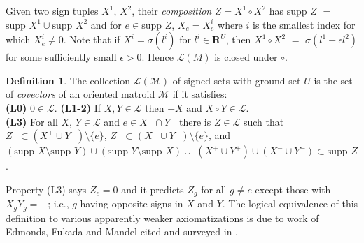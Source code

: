 \documentclass{amsproc-sunycstr}
\def\Reals{\ensuremath{\mathbf R}}
\theoremstyle{plain}
\theoremstyle{definition}
\newtheorem{definition}{Definition}
\theoremstyle{remark}
\newcommand{\supp}[1]{{{\mbox{supp\ }#1}}}
\begin{document}
Given two sign tuples $X^1$, $X^2$, their \textit{composition}
$Z=X^1 \circ X^2$ has $\supp{Z}$ $=$ 
$\supp{X^1}\cup \supp{X^2}$
and 
for $e\in\supp{Z}$,
$X_e=X^i_e$ where $i$ is the smallest index for which $X^i_e\neq 0$.
Note that if $X^i=\sigma(l^i)$ for $l^i\in\Reals^U$, then $X^1\circ X^2$
$=$ $\sigma(l^1 + \epsilon l^2)$ for some sufficiently small $\epsilon >0$.
Hence $\mathcal{L}(M)$ is closed under 
$\circ$.

\label{OMDEFsec}
\begin{definition}
\label{OMDEF}
The collection $\mathcal{L}(\mathcal{M})$ 
of signed sets with ground set $U$ is the set of 
\textit{covectors} of an oriented matroid 
$\mathcal{M}$ if it satisfies:\\
\textbf{(L0)} $0\in\mathcal{L}$. \textbf{(L1-2)} If $X,Y\in
      \mathcal{L}$ then $-X$ and $X\circ Y\in\mathcal{L}$.\\
\textbf{(L3)} For all $X$, $Y \in \mathcal{L}$ and $e\in X^+\cap Y^-$
there is
$Z\in\mathcal{L}$ such that 
$Z^+\subset(X^+\cup Y^+)\setminus\{e\}$,
$Z^-\subset(X^-\cup Y^-)\setminus\{e\}$,    %
and 
$(\supp{X}\setminus \supp{Y})\cup(\supp{Y}\setminus \supp{X})\cup$ %
$(X^+\cup Y^+)\cup(X^-\cup Y^-)\subset\supp{Z}$.
\end{definition}
Property (L3) says $Z_e=0$ and it predicts $Z_g$ for all
$g\neq e$ except those with $X_gY_g = -$; i.e., $g$
having opposite signs in
$X$ and $Y$.  The logical
equivalence of this definition to various apparently weaker
axiomatizations is due to work of Edmonds, Fukada and 
Mandel cited and surveyed in \cite{OMBOOK}.
\end{document}
